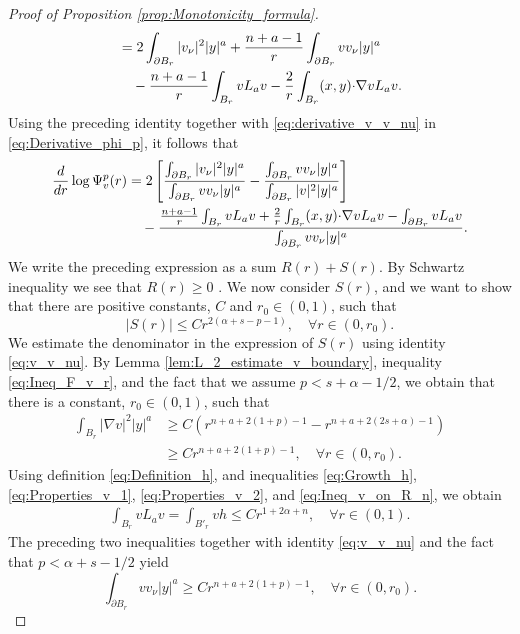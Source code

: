 \documentclass[11pt,reqno]{amsart}
\theoremstyle{definition}
\theoremstyle{remark}
\begin{document}
\begin{proof}[Proof of Proposition \ref{prop:Monotonicity_formula}]
\begin{align*}
&= 2\int_{\partial B_r} |v_{\nu}|^2 |y|^a + \frac{n+a-1}{r} \int_{\partial B_r} v v_{\nu} |y|^a \\
&\quad - \frac{n+a-1}{r} \int_{B_r} v L_a v -\frac{2}{r} \int_{B_r} (x,y){\hbox{$\cdot$}} \nabla v L_a v.
\end{align*}
Using the preceding identity together with \eqref{eq:derivative_v_v_nu} in \eqref{eq:Derivative_phi_p}, it follows that
\begin{align*}
\frac{d}{dr}\log \Psi^p_v(r)  
&=2\left[\frac{\int_{\partial B_r} |v_{\nu}|^2|y|^a}{\int_{\partial B_r} v v_{\nu}|y|^a}-\frac{\int_{\partial B_r} v v_{\nu}|y|^a}{\int_{\partial B_r} |v|^2|y|^a}\right]\\
&\quad-\frac{\frac{n+a-1}{r} \int_{B_r} v L_a v +\frac{2}{r} \int_{B_r} (x,y){\hbox{$\cdot$}} \nabla v L_a v-\int_{\partial B_r} v L_a v}{\int_{\partial B_r} v v_{\nu}|y|^a}.
\end{align*}
We write the preceding expression as a sum $R(r)+S(r)$. By Schwartz inequality we see that $R(r)\geq 0$ . We now consider $S(r)$, and we want to show that there are positive constants, $C$ and $r_0\in (0,1)$, such that
\begin{equation}
\label{eq:Sup_estimate_S}
|S(r)| \leq C r^{2(\alpha+s-p-1)},\quad\forall r\in (0,r_0).
\end{equation}
We estimate the denominator in the expression of $S(r)$ using identity \eqref{eq:v_v_nu}. By Lemma \ref{lem:L_2_estimate_v_boundary}, inequality \eqref{eq:Ineq_F_v_r}, and the fact that we assume $p<s+\alpha-1/2$, we obtain that there is a constant, $r_0\in (0,1)$, such that
\begin{align*}
\int_{B_r} |\nabla v|^2|y|^a &\geq C(r^{n+a+2(1+p)-1}-r^{n+a+2(2s+\alpha)-1})\\
&\geq Cr^{n+a+2(1+p)-1},\quad\forall r\in(0,r_0).
\end{align*}
Using definition \eqref{eq:Definition_h}, and inequalities \eqref{eq:Growth_h}, \eqref{eq:Properties_v_1}, \eqref{eq:Properties_v_2}, and \eqref{eq:Ineq_v_on_R_n}, we obtain
\begin{align*}
\int_{B_r} v L_a v = \int_{B'_r} v h\leq Cr^{1+2\alpha+n},\quad\forall r\in(0,1).
\end{align*} 
The preceding two inequalities together with identity \eqref{eq:v_v_nu} and the fact that $p<\alpha+s-1/2$  yield
\begin{equation}
\label{eq:Denominator_S}
\int_{\partial B_r} v v_{\nu}|y|^a \geq C r^{n+a+2(1+p)-1},\quad\forall r\in(0,r_0).
\end{equation}

\end{proof}
\end{document}
